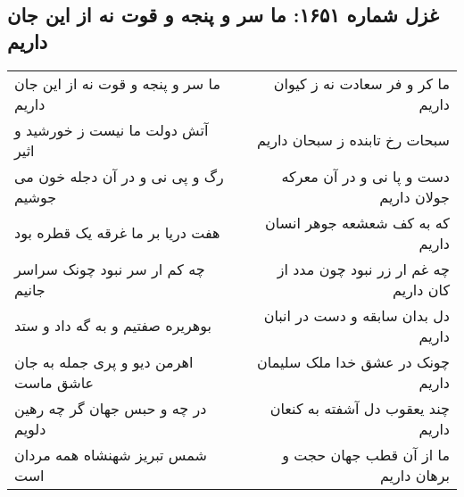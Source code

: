 \begin{center}
\section*{غزل شماره ۱۶۵۱: ما سر و پنجه و قوت نه از این جان داریم}
\label{sec:1651}
\begin{longtable}{l p{0.5cm} r}
ما سر و پنجه و قوت نه از این جان داریم
&&
ما کر و فر سعادت نه ز کیوان داریم
\\
آتش دولت ما نیست ز خورشید و اثیر
&&
سبحات رخ تابنده ز سبحان داریم
\\
رگ و پی نی و در آن دجله خون می جوشیم
&&
دست و پا نی و در آن معرکه جولان داریم
\\
هفت دریا بر ما غرقه یک قطره بود
&&
که به کف شعشعه جوهر انسان داریم
\\
چه کم ار سر نبود چونک سراسر جانیم
&&
چه غم ار زر نبود چون مدد از کان داریم
\\
بوهریره صفتیم و به گه داد و ستد
&&
دل بدان سابقه و دست در انبان داریم
\\
اهرمن دیو و پری جمله به جان عاشق ماست
&&
چونک در عشق خدا ملک سلیمان داریم
\\
در چه و حبس جهان گر چه رهین دلویم
&&
چند یعقوب دل آشفته به کنعان داریم
\\
شمس تبریز شهنشاه همه مردان است
&&
ما از آن قطب جهان حجت و برهان داریم
\\
\end{longtable}
\end{center}
